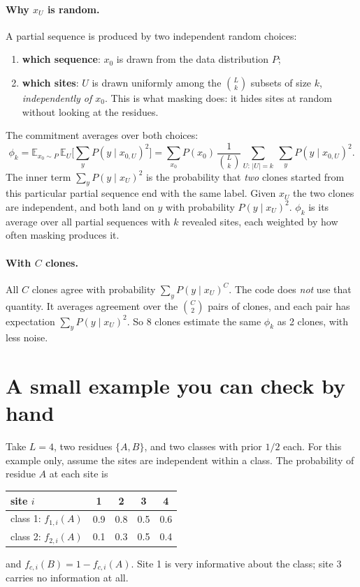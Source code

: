 \documentclass[11pt,a4paper]{article}
\newcommand{\E}{\mathbb{E}}
\begin{document}
\paragraph{Why $x_U$ is random.} A partial sequence is produced by two independent random choices:
\begin{enumerate}[nosep]
\item \textbf{which sequence}: $x_0$ is drawn from the data distribution $P$;
\item \textbf{which sites}: $U$ is drawn uniformly among the $\binom Lk$ subsets of size $k$, \emph{independently of
$x_0$}. This is what masking does: it hides sites at random without looking at the residues.
\end{enumerate}
The commitment averages over both choices:
\begin{equation}\label{eq:phi}
\phi_k=\E_{x_0\sim P}\,\E_U\Big[\sum_yP(y\mid x_{0,U})^2\Big]
=\sum_{x_0}P(x_0)\,\frac1{\binom Lk}\sum_{U:\,|U|=k}\ \sum_yP(y\mid x_{0,U})^2 .
\end{equation}
The inner term $\sum_yP(y\mid x_U)^2$ is the probability that \emph{two} clones started from this particular partial
sequence end with the same label. Given $x_U$ the two clones are independent, and both land on $y$ with probability
$P(y\mid x_U)^2$. $\phi_k$ is its average over all partial sequences with $k$ revealed sites, each weighted by how often
masking produces it.

\paragraph{With $C$ clones.} All $C$ clones agree with probability $\sum_yP(y\mid x_U)^C$. The code does \emph{not} use
that quantity. It averages agreement over the $\binom C2$ pairs of clones, and each pair has expectation
$\sum_yP(y\mid x_U)^2$. So 8 clones estimate the same $\phi_k$ as 2 clones, with less noise.

\section{A small example you can check by hand}
Take $L=4$, two residues $\{A,B\}$, and two classes with prior $1/2$ each. For this example only, assume the sites are
independent within a class. The probability of residue $A$ at each site is
\begin{center}
\begin{tabular}{lcccc}
\toprule
site $i$ & 1 & 2 & 3 & 4\\
\midrule
class 1: $f_{1,i}(A)$ & 0.9 & 0.8 & 0.5 & 0.6\\
class 2: $f_{2,i}(A)$ & 0.1 & 0.3 & 0.5 & 0.4\\
\bottomrule
\end{tabular}
\end{center}
and $f_{c,i}(B)=1-f_{c,i}(A)$. Site 1 is very informative about the class; site 3 carries no information at all.
\end{document}
